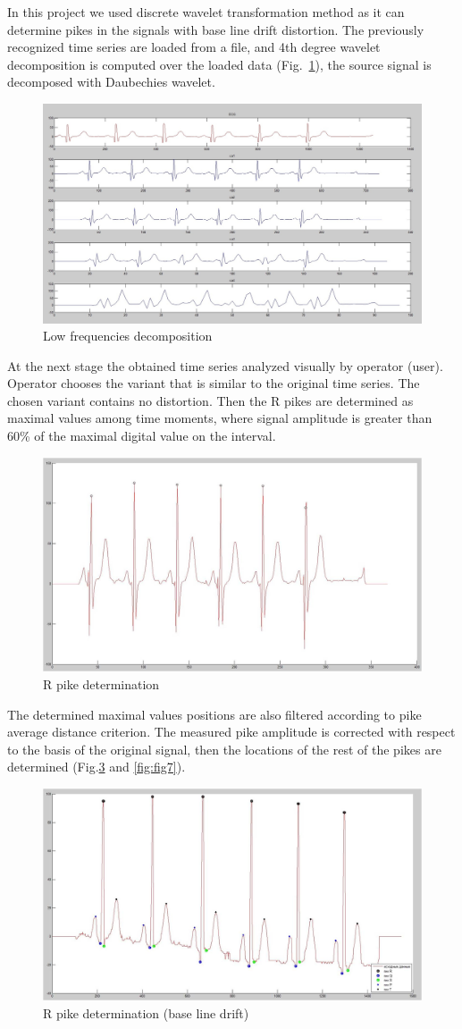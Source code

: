 \documentclass[runningheads]{AIIT}
\begin{document}
In this project we used discrete wavelet transformation method as it can determine pikes in the signals with base line drift distortion.  The previously recognized time series are loaded from a file, and 4th degree wavelet decomposition is computed over the loaded data (Fig.~\ref{fig:decomp}), the source signal is decomposed with Daubechies wavelet.

\begin{figure}[htb]
  \centering
    \includegraphics[width=0.5\linewidth] {images/Decomposition.jpg}
  \caption{Low frequencies decomposition}
  \label{fig:decomp}
\end{figure}

At the next stage the obtained time series analyzed visually by operator (user).  Operator chooses the variant that is similar to the original time series.  The chosen variant contains no distortion.  Then the R pikes are determined as maximal values among time moments, where signal amplitude is greater than 60\% of the maximal digital value on the interval.

\begin{figure}[htb]
  \centering
    \includegraphics[width=0.5\linewidth] {images/R-pike.jpg}
  \caption{R pike determination}
  \label{fig:determ-R}
\end{figure}
The determined maximal values positions are also filtered according to pike average distance criterion.  The measured pike amplitude is corrected with respect to the basis of the original signal, then the locations of the rest of the pikes are determined (Fig.\ref{fig:fig6} and \ref{fig:fig7}).

\begin{figure}[htb]
  \centering
    \includegraphics[width=0.5\linewidth] {images/Drift.jpg}
  \caption{R pike determination (base line drift)}
  \label{fig:fig6}
\end{figure}
\end{document}
